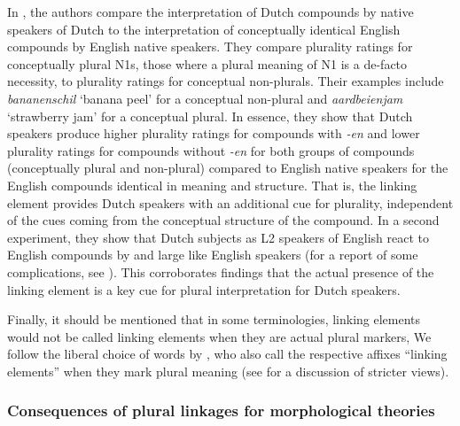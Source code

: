 In \textcite{BangaEa2013b}, the authors compare the interpretation of Dutch compounds by native speakers of Dutch to the interpretation of conceptually identical English compounds by English native speakers.
They compare plurality ratings for conceptually plural N1s, \ie those where a plural meaning of N1 is a de-facto necessity, to plurality ratings for conceptual non-plurals.
Their examples include \textit{bananenschil} `banana peel' for a conceptual non-plural and \textit{aardbeienjam} `strawberry jam' for a conceptual plural.
In essence, they show that Dutch speakers produce higher plurality ratings for compounds with \textit{-en} and lower plurality ratings for compounds without \textit{-en} for both groups of compounds (conceptually plural and non-plural) compared to English native speakers for the English compounds identical in meaning and structure.
That is, the linking element provides Dutch speakers with an additional cue for plurality, independent of the cues coming from the conceptual structure of the compound.
In a second experiment, they show that Dutch subjects as L2 speakers of English react to English compounds by and large like English speakers (for a report of some complications, see \citealt[211]{BangaEa2013b}).
This corroborates findings that the actual presence of the linking element is a key cue for plural interpretation for Dutch speakers.

Finally, it should be mentioned that in some terminologies, linking elements would not be called linking elements when they are actual plural markers,
We follow the liberal choice of words by \textcite{BangaEa2013b}, who also call the respective affixes ``linking elements'' when they mark plural meaning (see \citealt[196]{BangaEa2013b} for a discussion of stricter views).


\subsubsection{Consequences of plural linkages for morphological theories}
\label{sec:consequencesofplurallinkagesformorphologicaltheories}

